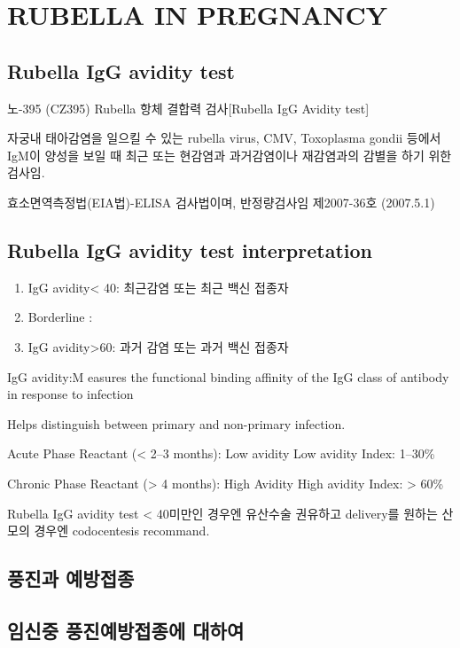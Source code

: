 \section{RUBELLA IN PREGNANCY}
\subsection{Rubella IgG avidity test}
\begin{mdframed}[linecolor=blue,middlelinewidth=2]
노-395 (CZ395) Rubella 항체 결합력 검사[Rubella IgG Avidity test] \par
자궁내 태아감염을 일으킬 수 있는 rubella virus, CMV, Toxoplasma gondii 등에서 IgM이 양성을 보일 때 최근 또는 현감염과 과거감염이나 재감염과의 감별을 하기 위한 검사임.\par
[실시방법]\par
효소면역측정법(EIA법)-ELISA 검사법이며, 반정량검사임
제2007-36호 (2007.5.1)
\end{mdframed}
\prezi{\clearpage}
\subsection{Rubella IgG avidity test interpretation}
\begin{enumerate}\tightlist
\item IgG avidity< 40: 최근감염 또는 최근 백신 접종자
\item Borderline : 
\item IgG avidity>60: 과거 감염 또는 과거 백신 접종자 
\end{enumerate} 
IgG avidity:M easures the functional binding affinity of the IgG class of antibody in response to infection\par
Helps distinguish between primary and non-primary infection.\par
Acute Phase Reactant (< 2–3 months): Low avidity  Low avidity Index: 1–30\% \par
Chronic Phase Reactant (> 4 months): High Avidity High avidity Index: > 60\% \par
Rubella IgG avidity test < 40미만인 경우엔 유산수술 권유하고 delivery를 원하는 산모의 경우엔 codocentesis recommand.
\prezi{\clearpage}
\subsection{풍진과 예방접종}
\subsection{임신중 풍진예방접종에 대하여}
